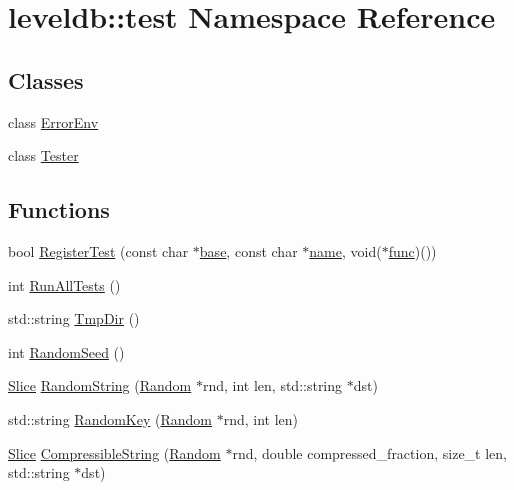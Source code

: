 \hypertarget{namespaceleveldb_1_1test}{}\section{leveldb\+:\+:test Namespace Reference}
\label{namespaceleveldb_1_1test}
\subsection*{Classes}
\begin{DoxyCompactItemize}
\item 
class \hyperlink{classleveldb_1_1test_1_1_error_env}{Error\+Env}
\item 
class \hyperlink{classleveldb_1_1test_1_1_tester}{Tester}
\end{DoxyCompactItemize}
\subsection*{Functions}
\begin{DoxyCompactItemize}
\item 
bool \hyperlink{namespaceleveldb_1_1test_aecde3e0440c4462e8d73aad728e3e819}{Register\+Test} (const char $\ast$\hyperlink{testharness_8cc_a70ff0f6c026c3dd1ef6aaf504e7fddc3}{base}, const char $\ast$\hyperlink{testharness_8cc_a8f8f80d37794cde9472343e4487ba3eb}{name}, void($\ast$\hyperlink{testharness_8cc_ac98d5d20f5aab3ef51e0ff5e30d16925}{func})())
\item 
int \hyperlink{namespaceleveldb_1_1test_a3329162c54a0bff42d41c2ac86b2580a}{Run\+All\+Tests} ()
\item 
std\+::string \hyperlink{namespaceleveldb_1_1test_ac259aab85eedba03d163bb3a86ae4645}{Tmp\+Dir} ()
\item 
int \hyperlink{namespaceleveldb_1_1test_a0d48ce23bccd2763df90789cb3aac03c}{Random\+Seed} ()
\item 
\hyperlink{classleveldb_1_1_slice}{Slice} \hyperlink{namespaceleveldb_1_1test_a2132c5f28cd21dcea4348246fa32b673}{Random\+String} (\hyperlink{classleveldb_1_1_random}{Random} $\ast$rnd, int len, std\+::string $\ast$dst)
\item 
std\+::string \hyperlink{namespaceleveldb_1_1test_ae6faec2042472bb9c3da124a677c4b96}{Random\+Key} (\hyperlink{classleveldb_1_1_random}{Random} $\ast$rnd, int len)
\item 
\hyperlink{classleveldb_1_1_slice}{Slice} \hyperlink{namespaceleveldb_1_1test_a7e336c887550b617dfd8bc0f61726779}{Compressible\+String} (\hyperlink{classleveldb_1_1_random}{Random} $\ast$rnd, double compressed\+\_\+fraction, size\+\_\+t len, std\+::string $\ast$dst)
\end{DoxyCompactItemize}


